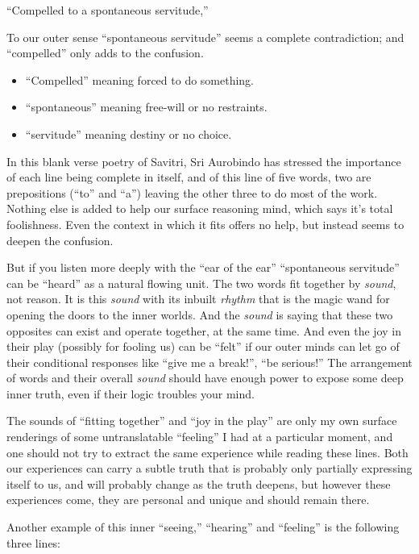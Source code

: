 \documentclass[12pt,a4paper]{book}
\begin{document}
``Compelled to a spontaneous servitude,''

To our outer sense ``spontaneous servitude'' seems a complete
contradiction; and ``compelled'' only adds to the confusion.

\begin{itemize}
\item [] ``Compelled'' meaning forced to do something.
\item [] ``spontaneous'' meaning free-will or no restraints.
\item [] ``servitude'' meaning destiny or no choice.
\end{itemize}

In this blank verse poetry of Savitri, Sri Aurobindo has stressed the
importance of each line being complete in itself, and of this line of
five words, two are prepositions (``to'' and ``a'') leaving the other
three to do most of the work. Nothing else is added to help our
surface reasoning mind, which says it's total foolishness. Even the
context in which it fits offers no help, but instead seems to deepen
the confusion.

But if you listen more deeply with the ``ear of the ear''
``spontaneous servitude'' can be ``heard'' as a natural flowing
unit. The two words fit together by \emph{sound}, not reason. It is
this \emph{sound} with its inbuilt \emph{rhythm} that is the magic
wand for opening the doors to the inner worlds. And the \emph{sound}
is saying that these two opposites can exist and operate together, at
the same time. And even the joy in their play (possibly for fooling
us) can be ``felt'' if our outer minds can let go of their conditional
responses like ``give me a break!'', ``be serious!''  The arrangement
of words and their overall \emph{sound} should have enough power to
expose some deep inner truth, even if their logic troubles your mind.

The sounds of ``fitting together'' and ``joy in the play'' are only my
own surface renderings of some untranslatable ``feeling'' I had at a
particular moment, and one should not try to extract the same
experience while reading these lines. Both our experiences can carry a
subtle truth that is probably only partially expressing itself to us,
and will probably change as the truth deepens, but however these
experiences come, they are personal and unique and should remain
there.

Another example of this inner ``seeing,'' ``hearing'' and ``feeling''
is the following three lines:
\end{document}
